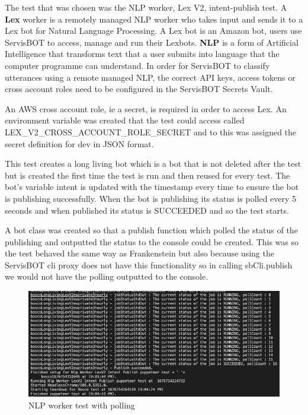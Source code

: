 \documentclass[12pt,a4paper,titlepage]{report}
\begin{document}
The test that was chosen was the NLP worker, Lex V2, intent-publish test. A \textbf{Lex} worker is a remotely managed NLP worker who takes input and sends it to a Lex bot for Natural Language Processing. A Lex bot is an Amazon bot, users use ServisBOT to access, manage and run their Lexbots. 
\textbf{NLP} is a form of Artificial Intelligence that transforms text that a user submits into language that the computer programme can understand. In order for ServisBOT to classify utterances using a remote managed NLP, the correct API keys, access tokens or cross account roles need to be configured in the ServisBOT Secrets Vault.

An AWS cross account role, ie a secret, is required in order to access Lex. An environment variable was created that the test could access called LEX\_V2\_CROSS\_ACCOUNT\_ROLE\_SECRET and to this was assigned the secret definition for dev in JSON format. 

This test creates a long living bot which is a bot that is not deleted after the test but is created the first time the test is run and then reused for every test. The bot's variable intent is updated with the timestamp every time to ensure the bot is publishing successfully. When the bot is publishing its status is polled every 5 seconds and when published its status is SUCCEEDED and so the test starts.

A bot class was created so that a publish function which polled the status of the publishing and outputted the status to the console could be created. This was so 
the test behaved the same way as Frankenstein but also because using the ServisBOT cli proxy does not have this functionality so in calling sbCli.publish we would 
not have the polling outputted to the console.

\begin{figure}[H]
 \centering
 \includegraphics[width=15cm]{./diagrams/nlp_worker_poll.png}
 \caption{NLP worker test with polling}
\end{figure}
\end{document}
